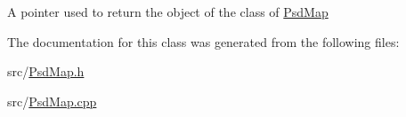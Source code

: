A pointer used to return the object of the class of \hyperlink{class_psd_map}{Psd\+Map} 

The documentation for this class was generated from the following files\+:\begin{DoxyCompactItemize}
\item 
src/\hyperlink{_psd_map_8h}{Psd\+Map.\+h}\item 
src/\hyperlink{_psd_map_8cpp}{Psd\+Map.\+cpp}\end{DoxyCompactItemize}
